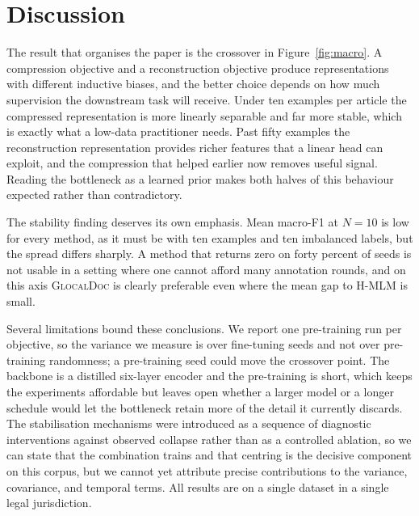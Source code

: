 \documentclass[conference]{IEEEtran}
\newcommand{\glocal}{\textsc{GlocalDoc}}
\newcommand{\hmlm}{\mbox{H-MLM}}
\begin{document}
\section{Discussion}
\label{sec:discussion}
The result that organises the paper is the crossover in Figure~\ref{fig:macro}. A
compression objective and a reconstruction objective produce representations with
different inductive biases, and the better choice depends on how much supervision the
downstream task will receive. Under ten examples per article the compressed
representation is more linearly separable and far more stable, which is exactly what
a low-data practitioner needs. Past fifty examples the reconstruction representation
provides richer features that a linear head can exploit, and the compression that
helped earlier now removes useful signal. Reading the bottleneck as a learned prior
makes both halves of this behaviour expected rather than contradictory.

The stability finding deserves its own emphasis. Mean macro-F1 at $N=10$ is low for
every method, as it must be with ten examples and ten imbalanced labels, but the
spread differs sharply. A method that returns zero on forty percent of seeds is not
usable in a setting where one cannot afford many annotation rounds, and on this axis
\glocal{} is clearly preferable even where the mean gap to \hmlm{} is small.

Several limitations bound these conclusions. We report one pre-training run per
objective, so the variance we measure is over fine-tuning seeds and not over
pre-training randomness; a pre-training seed could move the crossover point. The
backbone is a distilled six-layer encoder and the pre-training is short, which keeps
the experiments affordable but leaves open whether a larger model or a longer
schedule would let the bottleneck retain more of the detail it currently discards.
The stabilisation mechanisms were introduced as a sequence of diagnostic
interventions against observed collapse rather than as a controlled ablation, so we
can state that the combination trains and that centring is the decisive component on
this corpus, but we cannot yet attribute precise contributions to the variance,
covariance, and temporal terms. All results are on a single dataset in a single
legal jurisdiction.

\end{document}
